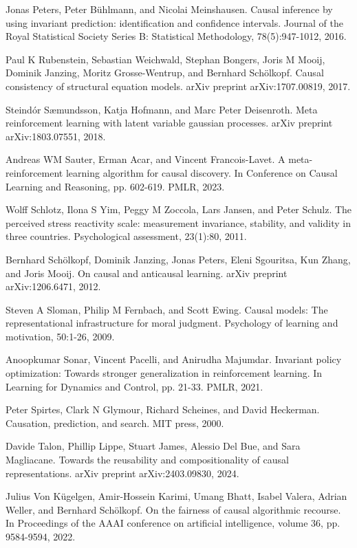 \documentclass[10pt]{article}
\begin{document}
Jonas Peters, Peter Bühlmann, and Nicolai Meinshausen. Causal inference by using invariant prediction: identification and confidence intervals. Journal of the Royal Statistical Society Series B: Statistical Methodology, 78(5):947-1012, 2016.

Paul K Rubenstein, Sebastian Weichwald, Stephan Bongers, Joris M Mooij, Dominik Janzing, Moritz Grosse-Wentrup, and Bernhard Schölkopf. Causal consistency of structural equation models. arXiv preprint arXiv:1707.00819, 2017.

Steindór Sæmundsson, Katja Hofmann, and Marc Peter Deisenroth. Meta reinforcement learning with latent variable gaussian processes. arXiv preprint arXiv:1803.07551, 2018.

Andreas WM Sauter, Erman Acar, and Vincent Francois-Lavet. A meta-reinforcement learning algorithm for causal discovery. In Conference on Causal Learning and Reasoning, pp. 602-619. PMLR, 2023.

Wolff Schlotz, Ilona S Yim, Peggy M Zoccola, Lars Jansen, and Peter Schulz. The perceived stress reactivity scale: measurement invariance, stability, and validity in three countries. Psychological assessment, 23(1):80, 2011.

Bernhard Schölkopf, Dominik Janzing, Jonas Peters, Eleni Sgouritsa, Kun Zhang, and Joris Mooij. On causal and anticausal learning. arXiv preprint arXiv:1206.6471, 2012.

Steven A Sloman, Philip M Fernbach, and Scott Ewing. Causal models: The representational infrastructure for moral judgment. Psychology of learning and motivation, 50:1-26, 2009.

Anoopkumar Sonar, Vincent Pacelli, and Anirudha Majumdar. Invariant policy optimization: Towards stronger generalization in reinforcement learning. In Learning for Dynamics and Control, pp. 21-33. PMLR, 2021.

Peter Spirtes, Clark N Glymour, Richard Scheines, and David Heckerman. Causation, prediction, and search. MIT press, 2000.

Davide Talon, Phillip Lippe, Stuart James, Alessio Del Bue, and Sara Magliacane. Towards the reusability and compositionality of causal representations. arXiv preprint arXiv:2403.09830, 2024.

Julius Von Kügelgen, Amir-Hossein Karimi, Umang Bhatt, Isabel Valera, Adrian Weller, and Bernhard Schölkopf. On the fairness of causal algorithmic recourse. In Proceedings of the AAAI conference on artificial intelligence, volume 36, pp. 9584-9594, 2022.
\end{document}
